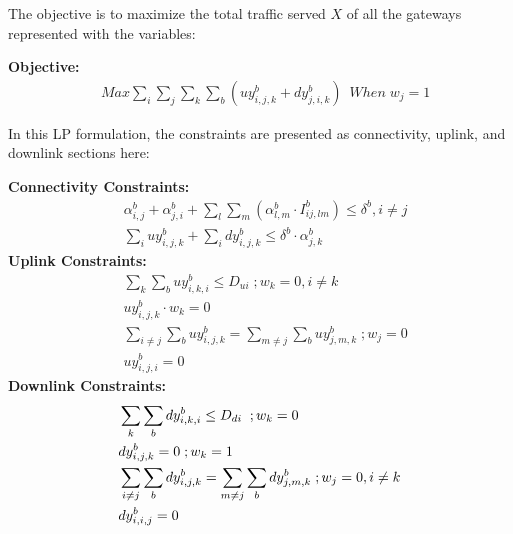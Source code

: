 The objective is to maximize the total traffic served $X$ of all the gateways
represented with the variables:

\noindent
{\bf Objective:}
\begin{align}
& Max \sum_i\sum_j\sum_k\sum_b(uy_{i,j,k}^b+dy_{j,i,k}^b) \;\ When \; w_j=1 
\end{align}

In this LP formulation, the constraints are presented as connectivity, uplink, and downlink sections here:  

\noindent
{\bf Connectivity Constraints:}
\begin{align}
\label{opt:1}
& \alpha_{i,j}^b + \alpha_{j,i}^b + \sum_l\sum_m(\alpha_{l,m}^b \cdot I_{ij,lm}^b) \leq \delta^b, i\neq j \\
\label{opt:2}
& \sum_i uy_{i,j,k}^b + \sum_i dy_{i,j,k}^b \leq \delta^b \cdot \alpha_{j,k}^b 
\end{align}
\noindent
{\bf Uplink Constraints:} 
\begin{align}
\label{opt:3}
& \sum_k \sum_b uy_{i,k,i}^b \leq D_{ui}  \; ; w_k=0, i \neq k \\
\label{opt:4}
& uy_{i,j,k}^b \cdot w_k = 0 \\
\label{opt:6}
& \sum_{i\neq j}\sum_b uy_{i,j,k}^b = \sum_{m\neq j} \sum_b uy_{j,m,k}^b \; ;w_j = 0\\
\label{opt:7}
& uy_{i,j,i}^b=0 
\end{align}
\noindent
{\bf Downlink Constraints:} 
\begin{align}
{\bf}
\label{opt:8}
& \sum_k \sum_b dy_{i,k,i}^b \leq D_{di} \; \; ; w_k=0 \\
\label{opt:9}
& dy_{i,j,k}^b =0  \; ;w_k=1 \\
\label{opt:11}
& \sum_{i\neq j} \sum_b dy_{i,j,k}^b = \sum_{m \neq j} \sum_b dy_{j,m,k}^b   \; ; w_j=0, i \neq k \\
\label{opt:12}
& dy_{i,i,j}^b=0
\end{align}

